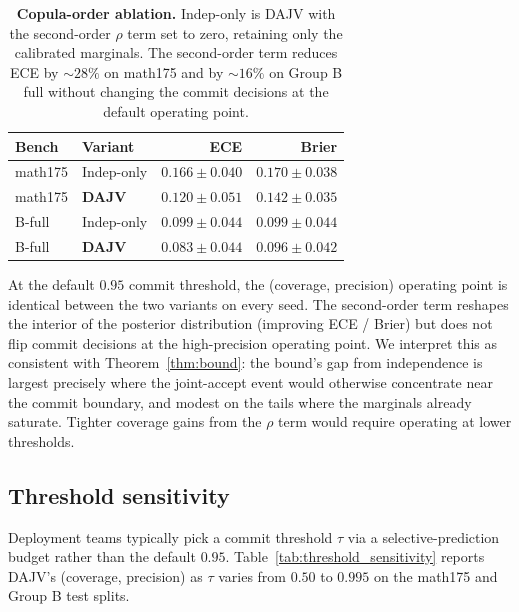 \begin{table}[h]
\centering
\caption{\textbf{Copula-order ablation.} Indep-only is DAJV with the
second-order $\rho$ term set to zero, retaining only the calibrated
marginals. The second-order term reduces ECE by $\sim 28\%$ on
math175 and by $\sim 16\%$ on Group B full without changing the commit
decisions at the default operating point.}
\label{tab:copula_order}
\small
\begin{tabular}{llrr}
\toprule
Bench    & Variant         & ECE                 & Brier              \\
\midrule
math175  & Indep-only      & $0.166 \pm 0.040$   & $0.170 \pm 0.038$  \\
math175  & \textbf{DAJV}   & $\mathbf{0.120 \pm 0.051}$ & $\mathbf{0.142 \pm 0.035}$ \\
\midrule
B-full   & Indep-only      & $0.099 \pm 0.044$   & $0.099 \pm 0.044$  \\
B-full   & \textbf{DAJV}   & $\mathbf{0.083 \pm 0.044}$ & $\mathbf{0.096 \pm 0.042}$ \\
\bottomrule
\end{tabular}
\end{table}

At the default $0.95$ commit threshold, the (coverage, precision)
operating point is identical between the two variants on every seed.
The second-order term reshapes the interior of the posterior
distribution (improving ECE / Brier) but does not flip commit
decisions at the high-precision operating point. We interpret this as
consistent with Theorem~\ref{thm:bound}: the bound's gap from
independence is largest precisely where the joint-accept event would
otherwise concentrate near the commit boundary, and modest on the tails
where the marginals already saturate. Tighter coverage gains from the
$\rho$ term would require operating at lower thresholds.

\subsection{Threshold sensitivity}
\label{app:threshold_sensitivity}

Deployment teams typically pick a commit threshold $\tau$ via a
selective-prediction budget rather than the default $0.95$.
Table~\ref{tab:threshold_sensitivity} reports DAJV's
(coverage, precision) as $\tau$ varies from $0.50$ to $0.995$ on the
math175 and Group B test splits.

